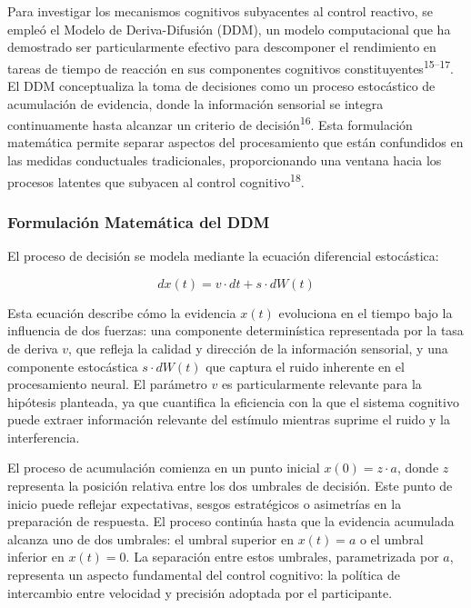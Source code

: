 \documentclass[
  spanish,
  10pt,
]{article}
\begin{document}
Para investigar los mecanismos cognitivos subyacentes al control
reactivo, se empleó el Modelo de Deriva-Difusión (DDM), un modelo
computacional que ha demostrado ser particularmente efectivo para
descomponer el rendimiento en tareas de tiempo de reacción en sus
componentes cognitivos constituyentes\textsuperscript{15--17}. El DDM
conceptualiza la toma de decisiones como un proceso estocástico de
acumulación de evidencia, donde la información sensorial se integra
continuamente hasta alcanzar un criterio de
decisión\textsuperscript{16}. Esta formulación matemática permite
separar aspectos del procesamiento que están confundidos en las medidas
conductuales tradicionales, proporcionando una ventana hacia los
procesos latentes que subyacen al control cognitivo\textsuperscript{18}.

\subsubsection{Formulación Matemática del
DDM}\label{formulaciuxf3n-matemuxe1tica-del-ddm}

El proceso de decisión se modela mediante la ecuación diferencial
estocástica:

\[dx(t) = v \cdot dt + s \cdot dW(t)\]

Esta ecuación describe cómo la evidencia \(x(t)\) evoluciona en el
tiempo bajo la influencia de dos fuerzas: una componente determinística
representada por la tasa de deriva \(v\), que refleja la calidad y
dirección de la información sensorial, y una componente estocástica
\(s \cdot dW(t)\) que captura el ruido inherente en el procesamiento
neural. El parámetro \(v\) es particularmente relevante para la
hipótesis planteada, ya que cuantifica la eficiencia con la que el
sistema cognitivo puede extraer información relevante del estímulo
mientras suprime el ruido y la interferencia.

El proceso de acumulación comienza en un punto inicial
\(x(0) = z \cdot a\), donde \(z\) representa la posición relativa entre
los dos umbrales de decisión. Este punto de inicio puede reflejar
expectativas, sesgos estratégicos o asimetrías en la preparación de
respuesta. El proceso continúa hasta que la evidencia acumulada alcanza
uno de dos umbrales: el umbral superior en \(x(t) = a\) o el umbral
inferior en \(x(t) = 0\). La separación entre estos umbrales,
parametrizada por \(a\), representa un aspecto fundamental del control
cognitivo: la política de intercambio entre velocidad y precisión
adoptada por el participante.
\end{document}

